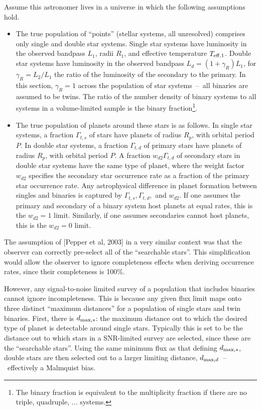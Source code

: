 \documentclass{emulateapj}
\begin{document}
Assume this astronomer lives in a universe in which the following assumptions 
hold.
\begin{itemize}
	\item The true population of ``points'' (stellar systems, all unresolved) 
	comprises only single and double star systems. Single star systems have 
	luminosity in the observed bandpass $L_1$, radii $R_1$, and effective 
	temperature $T_{\rm eff,1}$.
	Double star systems have luminosity in the observed bandpass $L_d = 
	(1+\gamma_R)L_1$, for $\gamma_R = L_2/L_1$ the ratio of the luminosity of 
	the secondary to the primary. 
	In this section, $\gamma_R=1$ across the population 
	of star systems~--~all binaries are assumed to be twins.
	The ratio of the number density of binary systems to all systems in a 
	volume-limited sample is the binary fraction\footnote{The 
	binary fraction is equivalent to the multiplicity fraction if there are 
	no triple, quadruple, $\ldots$ systems.}.
	\item The true population of planets around these stars is as follows.
    In single star systems, a fraction $\Gamma_{t,s}$ of stars 
	have planets of radius $R_p$, with orbital period $P$.
	In double star systems, a fraction $\Gamma_{t,d}$ of primary stars have 
	planets of radius $R_p$, with orbital period $P$. 
	A fraction $w_{d2}\Gamma_{t,d}$ of secondary stars in double star 
	systems have the same type of 
	planet, where the weight factor $w_{d2}$ specifies the secondary star 
	occurrence rate as a fraction	of the primary star occurrence rate.
	Any astrophysical difference in planet formation between singles and 
	binaries is captured by $\Gamma_{t,s}, \Gamma_{t,d},$ and $w_{d2}$.
	If one assumes the primary and secondary of a binary system host planets 
	at equal rates, this is the $w_{d2}=1$ limit.
	Similarly, if one assumes  secondaries 
	cannot host planets, this is the $w_{d2}=0$ limit.
\end{itemize}

The assumption of [Pepper et al, 2003] in a very similar context was that the 
observer can correctly pre-select all of the ``searchable stars''.
This simplification would allow the observer to ignore 
completeness effects when deriving occurrence rates, since their completeness 
is 100\%.

However, any signal-to-noise limited survey of a population that includes 
binaries cannot ignore incompleteness.
This is because any given flux limit maps onto three distinct ``maximum 
distances'' for a population of single stars and twin binaries.
First, there is $d_{{\rm max},s}$: the maximum distance out to which the 
desired type of planet is detectable around single stars. Typically this is 
set to be the distance out to which stars in a SNR-limited survey are 
selected, since these are the ``searchable stars''.
Using the same minimum flux as that defining $d_{{\rm max},s}$, double stars 
are then selected out to a larger limiting distance, $d_{{\rm 
max},d}$~--~effectively a Malmquist bias.
\end{document}
